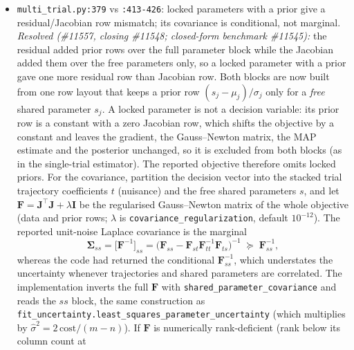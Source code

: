 \documentclass[11pt,a4paper]{article}
\newcommand{\bJ}{\mathbf{J}}
\begin{document}
\begin{itemize}[nosep]
    in \texttt{unqualified\_reasons}.  Computing those replay metrics remains open.  Reproduce with
    \texttt{python3 -m pytest tests/unit/estimation/test\_dime\_continuous\_replay.py
    tests/unit/estimation/test\_dime\_solver\_cache.py}.
  \item \texttt{multi\_trial.py:379} vs \texttt{:413-426}: locked parameters with a
    prior give a residual/Jacobian row mismatch; its covariance is conditional,
    not marginal.
    \emph{Resolved (\#11557, closing \#11548; closed-form benchmark \#11545):}
    the residual added prior rows over the full parameter block while the
    Jacobian added them over the free parameters only, so a locked parameter
    with a prior gave one more residual row than Jacobian row.  Both blocks are
    now built from one row layout that keeps a prior row
    $(s_j-\mu_j)/\sigma_j$ only for a \emph{free} shared parameter $s_j$.  A
    locked parameter is not a decision variable: its prior row is a constant
    with a zero Jacobian row, which shifts the objective by a constant and
    leaves the gradient, the Gauss--Newton matrix, the MAP estimate and the
    posterior unchanged, so it is excluded from both blocks (as in the
    single-trial estimator).  The reported objective therefore omits locked
    priors.  For the covariance, partition the decision vector into the
    stacked trial trajectory coefficients $t$ (nuisance) and the free shared
    parameters $s$, and let $\mathbf{F}=\bJ^{\!\top}\bJ+\lambda\mathbf{I}$ be
    the regularised Gauss--Newton matrix of the whole objective (data and
    prior rows; $\lambda$ is \texttt{covariance\_regularization}, default
    $10^{-12}$).  The reported unit-noise Laplace covariance is the marginal
    \begin{equation}
      \boldsymbol{\Sigma}_{ss}=\big[\mathbf{F}^{-1}\big]_{ss}
      =\big(\mathbf{F}_{ss}-\mathbf{F}_{st}\mathbf{F}_{tt}^{-1}\mathbf{F}_{ts}\big)^{-1}
      \;\succeq\;\mathbf{F}_{ss}^{-1},
      \label{eq:multitrial_marginal}
    \end{equation}
    whereas the code had returned the conditional $\mathbf{F}_{ss}^{-1}$, which
    understates the uncertainty whenever trajectories and shared parameters
    are correlated.  The implementation inverts the full $\mathbf{F}$ with
    \texttt{shared\_parameter\_covariance} and reads the $ss$ block, the same
    construction as \texttt{fit\_uncertainty.least\_squares\_parameter\_uncertainty}
    (which multiplies by $\hat\sigma^2=2\,\mathrm{cost}/(m-n)$).  If
    $\mathbf{F}$ is numerically rank-deficient (rank below its column count at

\end{itemize}
\end{document}
